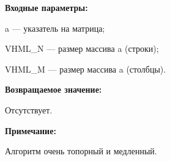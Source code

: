\textbf{Входные параметры:}  
 
a --- указатель на матрица;
 
VHML\_N --- размер массива a (строки);
 
VHML\_M --- размер массива a (столбцы).

\textbf{Возвращаемое значение:}

Отсутствует.

\textbf{Примечание:}

 Алгоритм очень топорный и медленный.